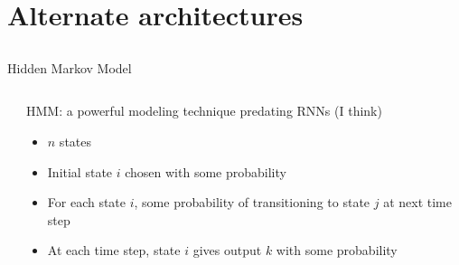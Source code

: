 \section{Alternate architectures}
\subsection{}

\begin{frame}{Hidden Markov Model}
    \begin{columns}
        \begin{column}{0.53\textwidth}
            
        \end{column}
        \begin{column}{0.47\textwidth}
            HMM: a powerful modeling technique predating RNNs (I think)
            \begin{itemize}
                \item $n$ states
                \item Initial state $i$ chosen with some probability
                \item For each state $i$, some probability of transitioning to state $j$ at next time step
                \item At each time step, state $i$ gives output $k$ with some probability
            \end{itemize}
        \end{column}
    \end{columns}
\end{frame}

